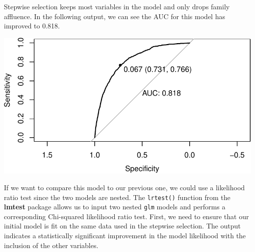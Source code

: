 \documentclass[
  letterpaper,
]{latex/krantz}
\makeatletter
\newenvironment{Shaded}{\begin{snugshade}}{\end{snugshade}}
\newcommand{\AttributeTok}[1]{\textcolor[rgb]{0.40,0.45,0.13}{#1}}
\newcommand{\ConstantTok}[1]{\textcolor[rgb]{0.56,0.35,0.01}{#1}}
\newcommand{\DecValTok}[1]{\textcolor[rgb]{0.68,0.00,0.00}{#1}}
\newcommand{\FunctionTok}[1]{\textcolor[rgb]{0.28,0.35,0.67}{#1}}
\newcommand{\NormalTok}[1]{\textcolor[rgb]{0.00,0.23,0.31}{#1}}
\newcommand{\OtherTok}[1]{\textcolor[rgb]{0.00,0.23,0.31}{#1}}
\newcommand{\SpecialCharTok}[1]{\textcolor[rgb]{0.37,0.37,0.37}{#1}}
\newcommand{\StringTok}[1]{\textcolor[rgb]{0.13,0.47,0.30}{#1}}
\newenvironment{kframe}{%
\medskip{}
\setlength{\fboxsep}{.8em}
 \def\at@end@of@kframe{}%
 \ifinner\ifhmode%
  \def\at@end@of@kframe{\end{minipage}}%
  \begin{minipage}{\columnwidth}%
 \fi\fi%
 \def\FrameCommand##1{\hskip\@totalleftmargin \hskip-\fboxsep
 \colorbox{shadecolor}{##1}\hskip-\fboxsep
     \hskip-\linewidth \hskip-\@totalleftmargin \hskip\columnwidth}%
 \MakeFramed {\advance\hsize-\width
   \@totalleftmargin\z@ \linewidth\hsize
   \@setminipage}}%
 {\par\unskip\endMakeFramed%
 \at@end@of@kframe}
\renewenvironment{Shaded}{\begin{kframe}}{\end{kframe}}
\makeatother
\begin{document}
Stepwise selection keeps most variables in the model and only drops
family affluence. In the following output, we can see the AUC for this
model has improved to 0.818.

\begin{Shaded}
\end{Shaded}

\begin{center}
\includegraphics[width=1\textwidth,height=\textheight]{book/logistic_regression_files/figure-pdf/unnamed-chunk-21-1.pdf}
\end{center}

If we want to compare this model to our previous one, we could use a
likelihood ratio test since the two models are nested. The
\texttt{lrtest()} function
from the \textbf{lmtest} package  allows us to
input two nested \texttt{glm} models and performs a corresponding
Chi-squared likelihood ratio test. First, we need to ensure that our
initial model is fit on the same data used in the stepwise selection.
The output indicates a statistically significant improvement in the
model likelihood with the inclusion of the other variables.
\end{document}
